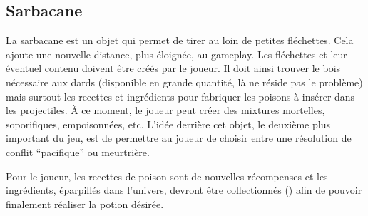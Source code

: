 \subsection{Sarbacane}
La sarbacane est un objet qui permet de tirer au loin de petites fléchettes. Cela ajoute une nouvelle distance, plus éloignée, au gameplay. Les fléchettes et leur éventuel contenu doivent être créés par le joueur. Il doit ainsi trouver le bois nécessaire aux dards (disponible en grande quantité, là ne réside pas le problème) mais surtout les recettes et ingrédients pour fabriquer les poisons à insérer dans les projectiles. À ce moment, le joueur peut créer des mixtures mortelles, soporifiques, empoisonnées, etc. L'idée derrière cet objet, le deuxième plus important du jeu, est de permettre au joueur de choisir entre une résolution de conflit \enquote{pacifique} ou meurtrière.

Pour le joueur, les recettes de poison sont de nouvelles récompenses et les ingrédients, éparpillés dans l'univers, devront être collectionnés () afin de pouvoir finalement réaliser la potion désirée.


